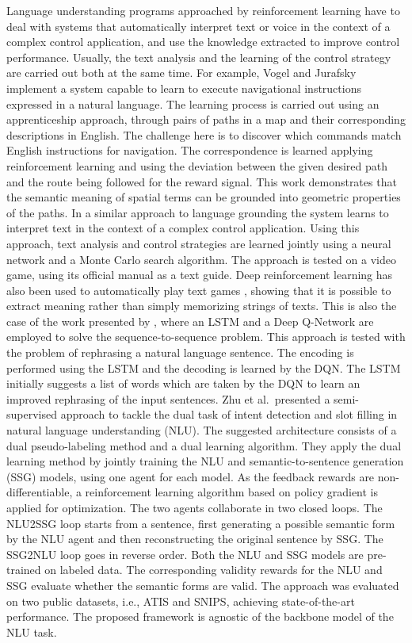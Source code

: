 Language understanding programs approached by reinforcement learning have to deal with systems that automatically interpret text or voice in the context of a complex control application, and use the knowledge extracted to improve control performance. Usually, the text analysis and the learning of the control strategy are carried out both at the same time. For example, Vogel and Jurafsky  implement a system capable to learn to execute navigational instructions expressed in a natural language. The learning process is carried out using an apprenticeship approach, through pairs of paths in a map and their corresponding descriptions in English. The challenge here is to discover which commands match English instructions for navigation. The correspondence is learned applying reinforcement learning and using the deviation between the given desired path and the route being followed for the reward signal. This work demonstrates that the semantic meaning of spatial terms can be grounded into geometric properties of the paths. In a similar approach to language grounding  the system learns to interpret text in the context of a complex control application. Using this approach, text analysis and control strategies are learned jointly using a neural network and a Monte Carlo search algorithm. The approach is tested on a video game, using its official manual as a text guide.
Deep reinforcement learning has also been used to automatically play text games , showing that it is possible to extract meaning rather than simply memorizing strings of texts. This is also the case of the work presented by , where an LSTM and a Deep Q-Network are employed to solve the sequence-to-sequence problem. This approach is tested with the problem of rephrasing a natural language sentence. The encoding is performed using the LSTM and the decoding is learned by the DQN. The LSTM initially suggests a list of words which are taken by the DQN to learn an improved rephrasing of the input sentences.
Zhu et al.\  presented a semi-supervised approach to tackle the dual task of intent detection and slot filling in natural language understanding (NLU). The suggested architecture consists of a dual pseudo-labeling method and a dual learning algorithm. They apply the dual learning method by jointly training the NLU and semantic-to-sentence generation (SSG) models, using one agent for each model. As the feedback rewards are non-differentiable, a reinforcement learning algorithm based on policy gradient is applied for optimization. The two agents collaborate in two closed loops. The NLU2SSG loop starts from a sentence, first generating a possible semantic form by the NLU agent and then reconstructing the original sentence by SSG. The SSG2NLU loop goes in reverse order. Both the NLU and SSG models are pre-trained on labeled data. The corresponding validity rewards for the NLU and SSG evaluate whether the semantic forms are valid. The approach was evaluated on two public datasets, i.e., ATIS and SNIPS, achieving state-of-the-art performance. The proposed framework is agnostic of the backbone model of the NLU task.
